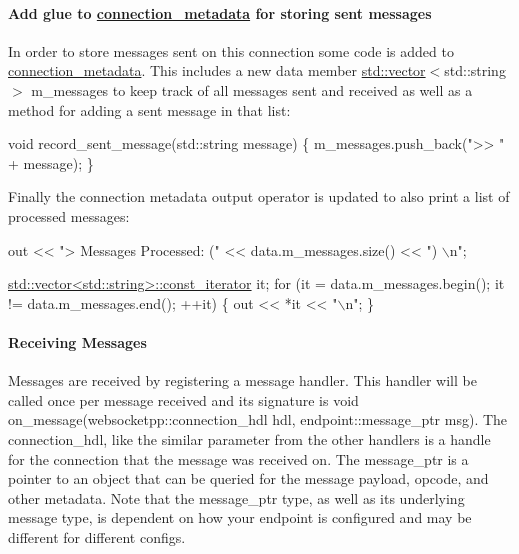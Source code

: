 \paragraph*{Add glue to {\ttfamily \mbox{\hyperlink{classconnection__metadata}{connection\+\_\+metadata}}} for storing sent messages}

In order to store messages sent on this connection some code is added to {\ttfamily \mbox{\hyperlink{classconnection__metadata}{connection\+\_\+metadata}}}. This includes a new data member {\ttfamily \mbox{\hyperlink{classstd_1_1vector}{std\+::vector}}$<$std\+::string$>$ m\+\_\+messages} to keep track of all messages sent and received as well as a method for adding a sent message in that list\+:


\begin{DoxyCode}
\textcolor{keywordtype}{void} record\_sent\_message(std::string message) \{
    m\_messages.push\_back(\textcolor{stringliteral}{">> "} + message);
\}
\end{DoxyCode}


Finally the connection metadata output operator is updated to also print a list of processed messages\+:


\begin{DoxyCode}
out << \textcolor{stringliteral}{"> Messages Processed: ("} << data.m\_messages.size() << \textcolor{stringliteral}{") \(\backslash\)n"};

\mbox{\hyperlink{classstd_1_1vector}{std::vector<std::string>::const\_iterator}} it;
\textcolor{keywordflow}{for} (it = data.m\_messages.begin(); it != data.m\_messages.end(); ++it) \{
    out << *it << \textcolor{stringliteral}{"\(\backslash\)n"};
\}
\end{DoxyCode}


\paragraph*{Receiving Messages}

Messages are received by registering a message handler. This handler will be called once per message received and its signature is {\ttfamily void on\+\_\+message(websocketpp\+::connection\+\_\+hdl hdl, endpoint\+::message\+\_\+ptr msg)}. The {\ttfamily connection\+\_\+hdl}, like the similar parameter from the other handlers is a handle for the connection that the message was received on. The {\ttfamily message\+\_\+ptr} is a pointer to an object that can be queried for the message payload, opcode, and other metadata. Note that the message\+\_\+ptr type, as well as its underlying message type, is dependent on how your endpoint is configured and may be different for different configs.

